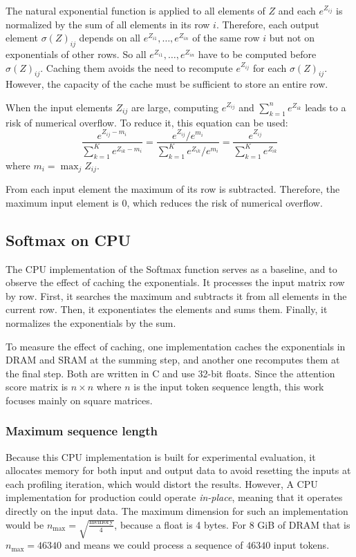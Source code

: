 \documentclass[conference]{IEEEtran}
\begin{document}
The natural exponential function is applied to all elements of \(Z\) and each \(e^{Z_{ij}}\) is normalized by the sum of all elements in its row \(i\). Therefore, each output element \(\sigma(Z)_{ij}\) depends on all \(e^{Z_{i1}}, \ldots, e^{Z_{in}}\) of the same row \(i\) but not on exponentials of other rows. So all \(e^{Z_{i1}}, \ldots, e^{Z_{in}}\) have to be computed before \(\sigma(Z)_{ij}\). Caching them avoids the need to recompute \(e^{Z_{ij}}\) for each \(\sigma(Z)_{ij}\). However, the capacity of the cache must be sufficient to store an entire row. 

When the input elements \(Z_{ij}\) are large, computing \(e^{Z_{ij}}\) and \(\sum_{k=1}^n e^{Z_{ik}}\) leads to a risk of numerical overflow. To reduce it, this equation can be used:
\begin{equation}
\frac{e^{Z_{ij} - m_i}}{\sum_{k=1}^{K} e^{Z_{ik} - m_i}} = \frac{e^{Z_{ij}} / e^{m_i}}{\sum_{k=1}^{K} e^{Z_{ik}} / e^{m_i}} = \frac{e^{Z_{ij}}}{\sum_{k=1}^{K} e^{Z_{ik}}}
\end{equation}
where $m_i = \max_j Z_{ij}$.

From each input element the maximum of its row is subtracted. Therefore, the maximum input element is \(0\), which reduces the risk of numerical overflow.

\subsection{Softmax on CPU}
The CPU implementation of the Softmax function serves as a baseline, and to observe the effect of caching the exponentials. It processes the input matrix row by row. First, it searches the maximum and subtracts it from all elements in the current row. Then, it exponentiates the elements and sums them. Finally, it normalizes the exponentials by the sum.

To measure the effect of caching, one implementation caches the exponentials in DRAM and SRAM at the summing step, and another one recomputes them at the final step. Both are written in C and use 32-bit floats. Since the attention score matrix is \(n \times n\) where \(n\) is the input token sequence length, this work focuses mainly on square matrices.

\subsubsection{\textbf{Maximum sequence length}}
Because this CPU implementation is built for experimental evaluation, it allocates memory for both input and output data to avoid resetting the inputs at each profiling iteration, which would distort the results.
However, A CPU implementation for production could operate \textit{in-place}, meaning that it operates directly on the input data. The maximum dimension for such an implementation would be \(n_{\text{max}} = \sqrt{\frac{\text{memory}}{4}}\), because a float is 4 bytes. For 8 GiB of DRAM that is \(n_{\text{max}} = 46340\) and means we could process a sequence of \(46340\) input tokens. 
\end{document}
